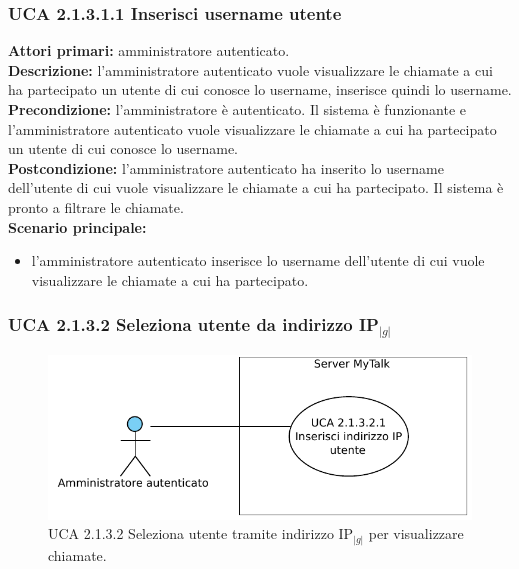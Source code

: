 \subsubsection{UCA 2.1.3.1.1 Inserisci username utente}
\noindent
\textbf{Attori primari:} amministratore autenticato.\\
\textbf{Descrizione:} l'amministratore autenticato vuole visualizzare le chiamate a cui ha partecipato un utente di cui conosce lo username, inserisce quindi lo username.\\
\textbf{Precondizione:} l'amministratore è autenticato. Il sistema è funzionante e l'amministratore autenticato vuole visualizzare le chiamate a cui ha partecipato un utente di cui conosce lo username.\\
\textbf{Postcondizione:} l'amministratore autenticato ha inserito lo username dell'utente di cui vuole visualizzare le chiamate a cui ha partecipato. Il sistema è pronto a filtrare le chiamate.\\
\textbf{Scenario principale:}
\begin{itemize}
\item l'amministratore autenticato inserisce lo username dell'utente di cui vuole visualizzare le chiamate a cui ha partecipato.
\end{itemize}

\subsubsection{UCA 2.1.3.2 Seleziona utente da indirizzo IP$_{|g|}$}

\begin{figure}[htbp]
\centering
\includegraphics[scale=0.7]{./casi_uso/UCA2-1-3-2.pdf}
\caption{UCA 2.1.3.2 Seleziona utente tramite indirizzo IP$_{|g|}$ per visualizzare chiamate.}
\end{figure}

